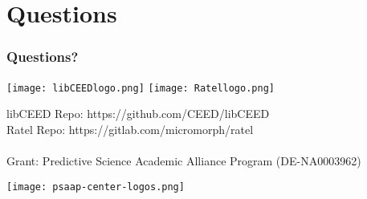 \documentclass{beamer}
\begin{document}
\section{Questions}

\begin{frame}
\frametitle{Questions?}

\begin{center}
\texttt{[image: libCEEDlogo.png]}
\texttt{[image: Ratellogo.png]}
\end{center}

{\flushleft

libCEED Repo: https://github.com/CEED/libCEED\\
Ratel Repo: https://gitlab.com/micromorph/ratel\\

~\\

Grant: Predictive Science Academic Alliance Program (DE-NA0003962)\\

}

\begin{center}
\texttt{[image: psaap-center-logos.png]}
\end{center}

\end{frame}


\begin{frame}[noframenumbering]
\titlepage %
\end{frame}

\begin{frame}
\end{frame}

\begin{frame}[noframenumbering]
\titlepage %
\end{frame}

\end{document}
